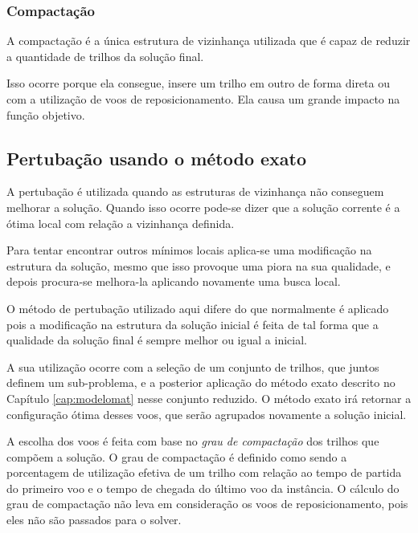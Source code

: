  
 \subsubsection{Compactação}
 
 A compactação é a única estrutura de vizinhança utilizada que é capaz de reduzir a quantidade de trilhos da solução final.
 
 Isso ocorre porque ela consegue, insere um trilho em outro de forma direta ou com a utilização de voos de reposicionamento. Ela causa um grande impacto na função objetivo.
 
 
 \subsection{Pertubação usando o método exato}
   
 A pertubação é utilizada quando as estruturas de vizinhança não conseguem melhorar a solução. Quando isso ocorre pode-se dizer que a solução corrente é a ótima local com relação a vizinhança definida.
 
 Para tentar encontrar outros mínimos locais aplica-se uma modificação na estrutura da solução, mesmo que isso provoque uma piora na sua qualidade, e depois procura-se melhora-la aplicando novamente uma busca local.
 
 O método de pertubação utilizado aqui difere do que normalmente é aplicado pois a modificação na estrutura da solução inicial é feita de tal forma que a qualidade da solução final é sempre melhor ou igual a inicial.
 
 A sua utilização ocorre com a seleção de um conjunto de trilhos, que juntos definem um sub-problema, e a posterior aplicação do método exato descrito no Capítulo \ref{cap:modelomat} nesse conjunto reduzido. O método exato irá retornar a configuração ótima desses voos, que serão agrupados novamente a solução inicial.
 
 A escolha dos voos é feita com base no \textit{grau de compactação} dos trilhos que compõem a solução. O grau de compactação é definido como sendo a porcentagem de utilização efetiva de um trilho com relação ao tempo de partida do primeiro voo e o tempo de chegada do último voo da instância. O cálculo do grau de compactação não leva em consideração os voos de reposicionamento, pois eles não são passados para o solver.
 
